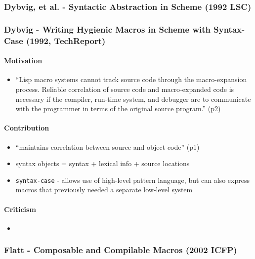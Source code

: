 \documentclass[12pt]{article}	%
\begin{document}
\subsubsection*{Dybvig, et al. - Syntactic Abstraction in Scheme (1992 LSC)}
\subsubsection*{Dybvig - Writing Hygienic Macros in Scheme with Syntax-Case (1992, TechReport)}
\paragraph{Motivation}
\begin{itemize}
	\item ``Lisp macro systems cannot track source code through the macro-expansion process. Reliable correlation of source code and macro-expanded code is necessary if the compiler, run-time system, and debugger are to communicate with the programmer in terms of the original source program.'' (p2)
\end{itemize}
\paragraph{Contribution}
\begin{itemize}
	\item ``maintains correlation between source and object code'' (p1)
	\item syntax objects = syntax + lexical info + source locations
	\item \verb!syntax-case! - allows use of high-level pattern language, but can also express macros that previously needed a separate low-level system
\end{itemize}
\paragraph{Criticism}
\begin{itemize}
	\item
\end{itemize}



\subsubsection*{Flatt - Composable and Compilable Macros (2002 ICFP)}
\end{document}

